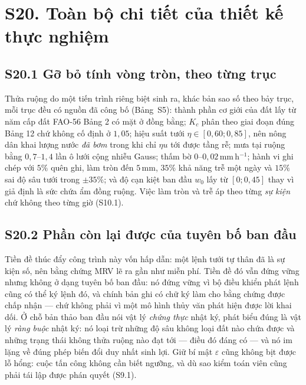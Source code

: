 \section*{S20. Toàn bộ chi tiết của thiết kế thực nghiệm}

\subsection*{S20.1 Gỡ bỏ tính vòng tròn, theo từng trục}

Thửa ruộng do một tiến trình riêng biệt sinh ra, khác bản sao số theo bảy trục, mỗi trục đều có
nguồn đã công bố (Bảng~S5): thành phần cơ giới của đất lấy từ năm cấp đất FAO-56 Bảng 2 có mặt ở
đồng bằng; $K_c$ phân theo giai đoạn đúng Bảng 12 chứ không cố định ở $1{,}05$; hiệu suất tưới
$\eta\in[0{,}60;0{,}85]$, nên nông dân khai lượng nước \emph{đã bơm} trong khi chỉ $\eta u$ tới
được tầng rễ; mưa tại ruộng bằng $0{,}7$--$1{,}4$ lần ô lưới cộng nhiễu Gauss; thấm bờ
$0$--$0{,}02$\,mm\,h$^{-1}$; hành vi ghi chép với $5\%$ quên ghi, làm tròn đến $5$\,mm, $35\%$
khả năng trễ một ngày và $15\%$ sai độ sâu tưới trong $\pm35\%$; và độ cạn kiệt ban đầu $w_0$ lấy từ
$[0;0{,}45]$ thay vì giả định là sức chứa ẩm đồng ruộng. Việc làm tròn và trễ áp theo từng
\emph{sự kiện} chứ không theo từng giờ (S10.1).

\subsection*{S20.2 Phần còn lại được của tuyên bố ban đầu}

Tiền đề thúc đẩy công trình này vốn hấp dẫn: một lệnh tưới tự thân đã là sự kiện số, nên bằng
chứng MRV lẽ ra gần như miễn phí. Tiền đề đó vẫn đứng vững nhưng không ở dạng tuyên bố ban
đầu: nó đứng vững vì bộ điều khiển phát lệnh cũng có thể ký lệnh đó, và chính bản ghi có chữ
ký làm cho bằng chứng được chấp nhận --- chứ không phải vì một mô hình thủy văn phát hiện được
lời khai dối. Ở chỗ bản thảo ban đầu nói vật lý \emph{chứng thực} nhật ký, phát biểu đúng là
vật lý \emph{ràng buộc} nhật ký: nó loại trừ những độ sâu không loại đất nào chứa được và
những trạng thái không thửa ruộng nào đạt tới --- điều đó đáng có --- và nó im lặng về đúng
phép biến đổi duy nhất sinh lợi. Giữ bí mật $\varepsilon$ cũng không bịt được lỗ hổng: cuộc tấn
công không cần biết ngưỡng, và dù sao kiểm toán viên cũng phải tái lập được phán quyết
(S9.1).


